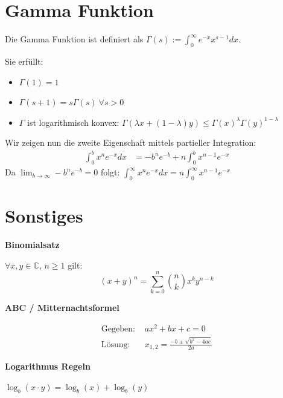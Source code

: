 \documentclass[25pt]{sciposter}
\newenvironment{method}[1]{\begin{mdframed}[backgroundcolor=blue!10,innertopmargin=15pt, innerbottommargin=15pt, nobreak=true]
		\textbf{#1 }
	}
	{ 
	\end{mdframed}
}
\begin{document}
\begin{multicols}{3}

\section*{Gamma Funktion}

Die Gamma Funktion ist definiert als $\Gamma (s) := \int_{0} ^{\infty} e^{-x} x^{s-1} dx$.

Sie erfüllt:
\begin{itemize}
	\item $\Gamma(1) = 1$
	\item $\Gamma(s+1) = s\Gamma(s) \ \forall s > 0$
	\item $\Gamma$ ist logarithmisch konvex: $\Gamma(\lambda x + (1-\lambda)y) \leq \Gamma(x)^\lambda \Gamma(y)^{1-\lambda}$
\end{itemize}
Wir zeigen nun die zweite Eigenschaft mittels partieller Integration:
\begin{align*}
	\int_{0}^{b} x^n e^{-x} dx &= -b^n e^{-b} + n \int_{0}^{b} x^{n-1}e^{-x}
\end{align*}
Da $\lim_{b \to \infty}  -b^n e^{-b} = 0$ folgt: $\int_{0}^{\infty} x^n e^{-x} dx =n \int_{0}^{\infty} x^{n-1}e^{-x}$











\section*{Sonstiges}
\begin{method}{Binomialsatz}
	$\forall x,y \in \mathbb{C}$, $n \geq 1$ gilt:
	$$(x+y)^n = \sum_{k=0}^{n} \binom{n}{k}x^k y^{n-k}$$
\end{method}

\begin{method}{ABC / Mitternachtsformel}
	\begin{align*}
		\text{Gegeben: } & ax^2 + bx + c = 0\\
		\text{Lösung: } & x_{1,2} = \frac{-b \pm \sqrt{b^2 -4ac}}{2a}
	\end{align*}
\end{method}


\begin{method}{Logarithmus Regeln}
${\displaystyle \log _{b}(x\cdot y)=\log _{b}(x)+\log _{b}(y)}$
\end{method}



\end{multicols}
\end{document}
